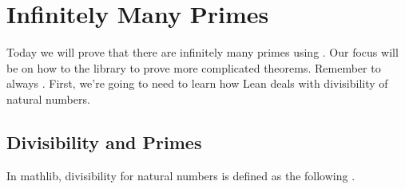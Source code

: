 \documentclass[letterpaper,10pt,english]{sphinxmanual}
\begin{document}
\begin{sphinxVerbatim}[commandchars=\\\{\}]

     
     
       

       
     
\end{sphinxVerbatim}

\sphinxstepscope


\chapter{Infinitely Many Primes}
\label{\detokenize{day3:infinitely-many-primes}}\label{\detokenize{day3:day3}}\label{\detokenize{day3::doc}}
\sphinxAtStartPar
Today we will prove that there are infinitely many primes using . Our focus will be on how to  the library to prove more complicated theorems. Remember to always .
First, we’re going to need to learn how Lean deals with divisibility of natural numbers.


\section{Divisibility and Primes}
\label{\detokenize{day3:divisibility-and-primes}}
\sphinxAtStartPar
In mathlib, divisibility for natural numbers is defined as the following .
\end{document}

